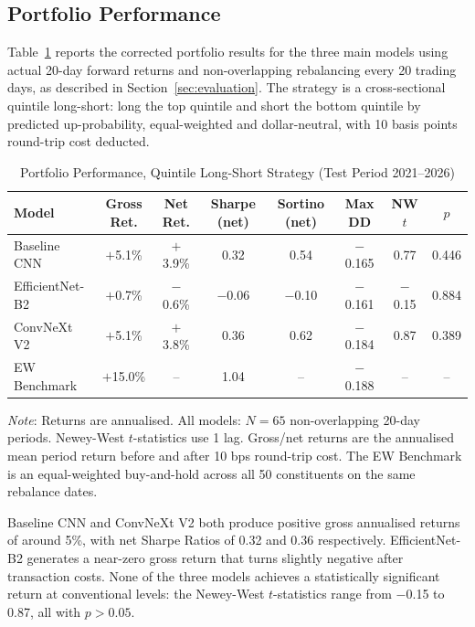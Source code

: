 \subsection{Portfolio Performance}
\label{sec:portfolio}

Table~\ref{tab:portfolio} reports the corrected portfolio results for the three main models using actual 20-day forward returns and non-overlapping rebalancing every 20 trading days, as described in Section~\ref{sec:evaluation}. The strategy is a cross-sectional quintile long-short: long the top quintile and short the bottom quintile by predicted up-probability, equal-weighted and dollar-neutral, with 10 basis points round-trip cost deducted.

\begin{table}[H]
\centering
\caption{Portfolio Performance, Quintile Long-Short Strategy (Test Period 2021--2026)}
\label{tab:portfolio}
\small
\begin{tabular}{lccccccc}
\toprule
\textbf{Model} & \textbf{Gross Ret.} & \textbf{Net Ret.} & \textbf{Sharpe (net)} & \textbf{Sortino (net)} & \textbf{Max DD} & \textbf{NW $t$} & \textbf{$p$} \\
\midrule
Baseline CNN    & $+$5.1\% & $+$3.9\% & 0.32 & 0.54 & $-$0.165 & 0.77 & 0.446 \\
EfficientNet-B2 & $+$0.7\% & $-$0.6\% & $-$0.06 & $-$0.10 & $-$0.161 & $-$0.15 & 0.884 \\
ConvNeXt V2     & $+$5.1\% & $+$3.8\% & 0.36 & 0.62 & $-$0.184 & 0.87 & 0.389 \\
\midrule
EW Benchmark    & $+$15.0\% & -- & 1.04 & -- & $-$0.188 & -- & -- \\
\bottomrule
\end{tabular}
\smallskip\par
{\small \textit{Note}: Returns are annualised. All models: $N = 65$ non-overlapping 20-day periods. Newey-West $t$-statistics use 1 lag. Gross/net returns are the annualised mean period return before and after 10 bps round-trip cost. The EW Benchmark is an equal-weighted buy-and-hold across all 50 constituents on the same rebalance dates.}
\end{table}

Baseline CNN and ConvNeXt V2 both produce positive gross annualised returns of around 5\%, with net Sharpe Ratios of 0.32 and 0.36 respectively. EfficientNet-B2 generates a near-zero gross return that turns slightly negative after transaction costs. None of the three models achieves a statistically significant return at conventional levels: the Newey-West $t$-statistics range from $-$0.15 to 0.87, all with $p > 0.05$.

